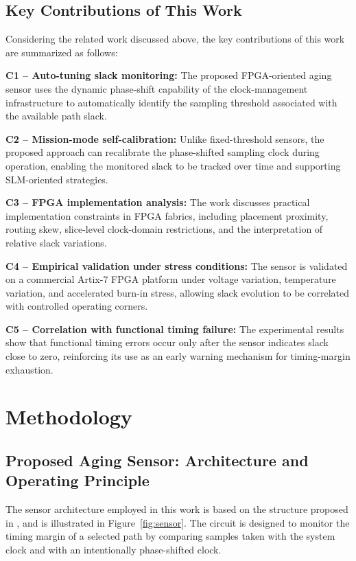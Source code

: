 \documentclass[a4paper,10pt,twoside,twocolumn,final]{JICS_LaTexGuidelines}
\begin{document}
\subsection{Key Contributions of This Work}

Considering the related work discussed above, the key contributions of this work are summarized as follows:


\noindent\textbf{C1 -- Auto-tuning slack monitoring:} The proposed FPGA-oriented aging sensor uses the dynamic phase-shift capability of the clock-management infrastructure to automatically identify the sampling threshold associated with the available path slack.

\noindent\textbf{C2 -- Mission-mode self-calibration:} Unlike fixed-threshold sensors, the proposed approach can recalibrate the phase-shifted sampling clock during operation, enabling the monitored slack to be tracked over time and supporting SLM-oriented strategies.

\noindent\textbf{C3 -- FPGA implementation analysis:} The work discusses practical implementation constraints in FPGA fabrics, including placement proximity, routing skew, slice-level clock-domain restrictions, and the interpretation of relative slack variations.

\noindent\textbf{C4 -- Empirical validation under stress conditions:} The sensor is validated on a commercial Artix-7 FPGA platform under voltage variation, temperature variation, and accelerated burn-in stress, allowing slack evolution to be correlated with controlled operating corners.

\noindent\textbf{C5 -- Correlation with functional timing failure:} The experimental results show that functional timing errors occur only after the sensor indicates slack close to zero, reinforcing its use as an early warning mechanism for timing-margin exhaustion.





\section{Methodology}\label{sec:methodology}

\subsection{Proposed Aging Sensor: Architecture and Operating Principle}
\label{sec:sensor_architecture}

The sensor architecture employed in this work is based on the structure proposed in \cite{Base_Sensor}, and is illustrated in Figure~\ref{fig:sensor}. The circuit is designed to monitor the timing margin of a selected path by comparing samples taken with the system clock and with an intentionally phase-shifted clock.
\end{document}
